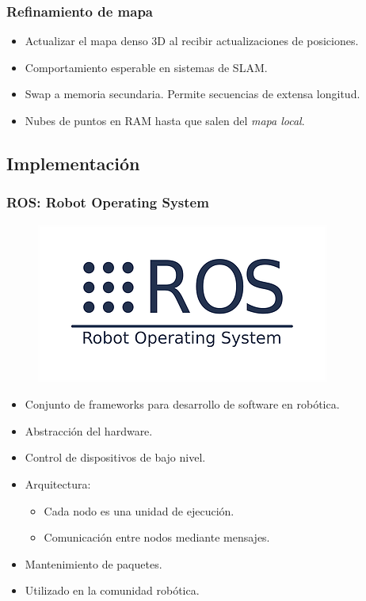 \documentclass[compress]{beamer}
\begin{document}
\begin{frame}
	\frametitle{Refinamiento de mapa}
	
	\begin{itemize}
		\item Actualizar el mapa denso 3D al recibir actualizaciones de posiciones.
		\item Comportamiento esperable en sistemas de SLAM.
		\item Swap a memoria secundaria. Permite secuencias de extensa longitud.
		\item Nubes de puntos en RAM hasta que salen del \emph{mapa local}.
	\end{itemize}

\end{frame}


\subsection{Implementación}


\begin{frame}
	\frametitle{ROS: Robot Operating System}
    \begin{figure}[htb]
        \centering
        \includegraphics[width=0.55\columnwidth]{method/ros.png}
    \end{figure}
	\vspace{-2em}
    \begin{itemize}
 		\item Conjunto de frameworks para desarrollo de software en robótica.
        \item Abstracción del hardware.
        \item Control de dispositivos de bajo nivel.
        \item Arquitectura:
            \begin{itemize}
	        	\item Cada nodo es una unidad de ejecución.
	        	\item Comunicación entre nodos mediante mensajes.
	        \end{itemize}
        \item Mantenimiento de paquetes.
        \item Utilizado en la comunidad robótica.
    \end{itemize}
\end{frame}
\end{document}
